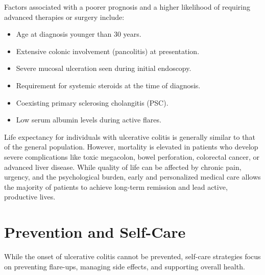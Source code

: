 Factors associated with a poorer prognosis and a higher likelihood of requiring advanced therapies or surgery include:
\begin{itemize}
  \item Age at diagnosis younger than $30$ years.
  \item Extensive colonic involvement (pancolitis) at presentation.
  \item Severe mucosal ulceration seen during initial endoscopy.
  \item Requirement for systemic steroids at the time of diagnosis.
  \item Coexisting primary sclerosing cholangitis (PSC).
  \item Low serum albumin levels during active flares.
\end{itemize}

Life expectancy for individuals with ulcerative colitis is generally similar to that of the general population. However, mortality is elevated in patients who develop severe complications like toxic megacolon, bowel perforation, colorectal cancer, or advanced liver disease. While quality of life can be affected by chronic pain, urgency, and the psychological burden, early and personalized medical care allows the majority of patients to achieve long-term remission and lead active, productive lives.

\section*{Prevention and Self-Care}
While the onset of ulcerative colitis cannot be prevented, self-care strategies focus on preventing flare-ups, managing side effects, and supporting overall health.

